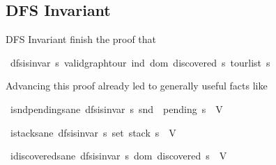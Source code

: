 \documentclass[%
	sans,
	12pt,
]{beamer}
\def\isacartoucheopen{}%
\def\isacartoucheclose{}%
\begin{document}
\subsection{DFS Invariant}
\begin{frame}{DFS Invariant}
	finish the proof that
	\begin{isabelle}
		\isamarkupfalse%
		\ {\isacartoucheopen}dfs{\isachardot}is{\isacharunderscore}invar\ {\isacharparenleft}{\isasymlambda}s{\isachardot}\ valid{\isacharunderscore}graph{\isachardot}tour\ {\isacharparenleft}ind{\isacharprime}\ {\isacharparenleft}dom\ {\isacharparenleft}discovered\ s{\isacharparenright}{\isacharparenright}{\isacharparenright}\ {\isacharparenleft}tour{\isacharunderscore}list\ s{\isacharparenright}{\isacharparenright}{\isacartoucheclose}
	\end{isabelle}\pause
	Advancing this proof already led to generally useful facts like
	\begin{isabelle}
		\isamarkupfalse%
		\ i{\isacharunderscore}snd{\isacharunderscore}pending{\isacharunderscore}sane{\isacharcolon}\ {\isacartoucheopen}dfs{\isachardot}is{\isacharunderscore}invar\ {\isacharparenleft}{\isasymlambda}s{\isachardot}\ snd\ {\isacharbackquote}\ {\isacharparenleft}pending\ s{\isacharparenright}\ {\isasymsubseteq}\ V{\isacharparenright}{\isacartoucheclose}
	\end{isabelle}\pause
	\begin{isabelle}
		\isamarkupfalse%
		\ i{\isacharunderscore}stack{\isacharunderscore}sane{\isacharcolon}\ {\isacartoucheopen}dfs{\isachardot}is{\isacharunderscore}invar\ {\isacharparenleft}{\isasymlambda}s{\isachardot}\ set\ {\isacharparenleft}stack\ s{\isacharparenright}\ {\isasymsubseteq}\ V{\isacharparenright}{\isacartoucheclose}
	\end{isabelle}\pause
	\begin{isabelle}
		\isamarkupfalse%
		\ i{\isacharunderscore}discovered{\isacharunderscore}sane{\isacharcolon}\ {\isacartoucheopen}dfs{\isachardot}is{\isacharunderscore}invar\ {\isacharparenleft}{\isasymlambda}s{\isachardot}\ dom\ {\isacharparenleft}discovered\ s{\isacharparenright}\ {\isasymsubseteq}\ V{\isacharparenright}{\isacartoucheclose}
	\end{isabelle}
\end{frame}
\end{document}
